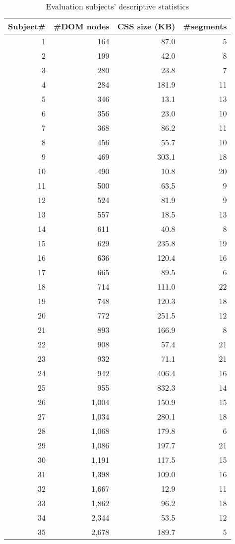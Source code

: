 \begin{table}
	\caption{Evaluation subjects' descriptive statistics}
	\centering
	\begin{threeparttable}
		\bgroup
		\begin{tabular}{r r r r}
			\toprule
			\textbf{Subject\#} & \textbf{\#DOM nodes}	& \textbf{CSS size (KB)}  &  \textbf{\#segments} \\
			\toprule
1 	 & 	 164 	 & 	 87.0 	 & 	 5 	 \\
2 	 & 	 199 	 & 	 42.0 	 & 	 8 	 \\
3 	 & 	 280 	 & 	 23.8 	 & 	 7 	 \\
4 	 & 	 284 	 & 	 181.9 	 & 	 11 	 \\
5 	 & 	 346 	 & 	 13.1 	 & 	 13 	 \\
6 	 & 	 356 	 & 	 23.0 	 & 	 10 	 \\
7 	 & 	 368 	 & 	 86.2 	 & 	 11 	 \\
8 	 & 	 456 	 & 	 55.7 	 & 	 10 	 \\
9 	 & 	 469 	 & 	 303.1 	 & 	 18 	 \\
10 	 & 	 490 	 & 	 10.8 	 & 	 20 	 \\
11 	 & 	 500 	 & 	 63.5 	 & 	 9 	 \\
12	 & 	 524 	 & 	 81.9 	 & 	 9 	 \\
13 	 & 	 557 	 & 	 18.5 	 & 	 13 	 \\
14 	 & 	 611 	 & 	 40.8 	 & 	 8 	 \\
15 	 & 	 629 	 & 	 235.8 	 & 	 19 	 \\
16 	 & 	 636 	 & 	 120.4 	 & 	 16 	 \\
17 	 & 	 665 	 & 	 89.5 	 & 	 6 	 \\
18 	 & 	 714 	 & 	 111.0 	 & 	 22 	 \\
19 	 & 	 748 	 & 	 120.3 	 & 	 18 	 \\
20 	 & 	 772 	 & 	 251.5 	 & 	 12 	 \\
21 	 & 	 893 	 & 	 166.9 	 & 	 8 	 \\
22 	 & 	 908 	 & 	 57.4 	 & 	 21 	 \\
23 	 & 	 932 	 & 	 71.1 	 & 	 21 	 \\
24 	 & 	 942 	 & 	 406.4 	 & 	 16 	 \\
25 	 & 	 955 	 & 	 832.3 	 & 	 14 	 \\
26 	 & 	 1,004 	 & 	 150.9 	 & 	 15 	 \\
27 	 & 	 1,034 	 & 	 280.1 	 & 	 18 	 \\
28 	 & 	 1,068 	 & 	 179.8 	 & 	 6 	 \\
29 	 & 	 1,086 	 & 	 197.7 	 & 	 21 	 \\
30 	 & 	 1,191 	 & 	 117.5 	 & 	 15 	 \\
31 	 & 	 1,398 	 & 	 109.0 	 & 	 16 	 \\
32 	 & 	 1,667 	 & 	 12.9 	 & 	 11 	 \\
33 	 & 	 1,862 	 & 	 96.2 	 & 	 18 	 \\
34 	 & 	 2,344 	 & 	 53.5 	 & 	 12 	 \\
35 	 & 	 2,678 	 & 	 189.7 	 & 	 5 	 \\



\end{tabular}
\end{threeparttable}
\end{table}
